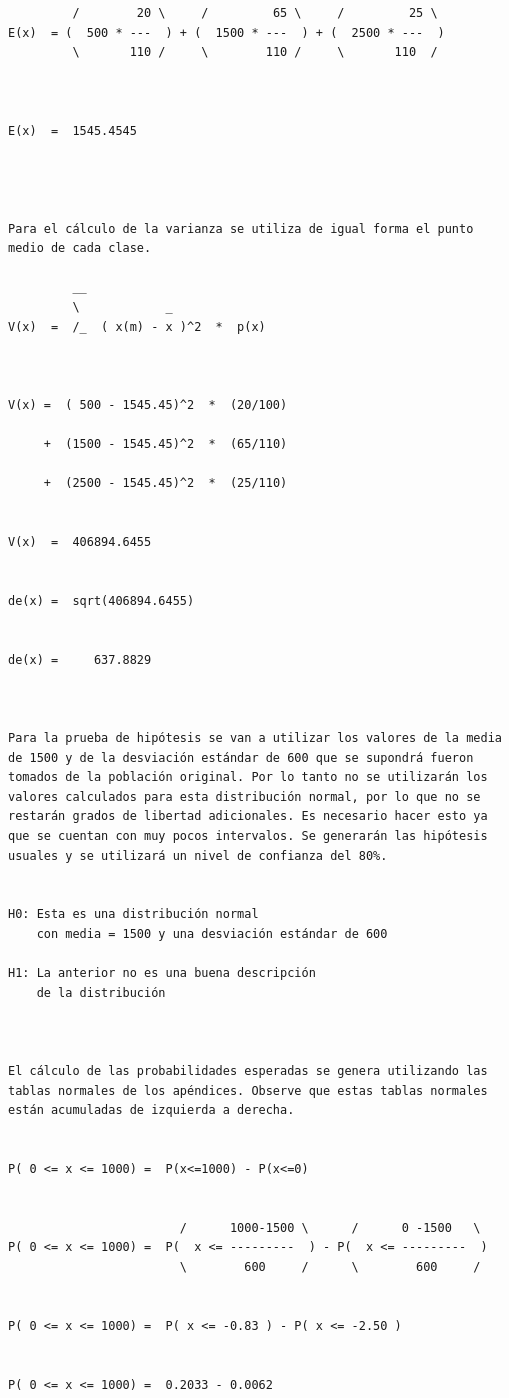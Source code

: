 \begin{verbatim}
         /        20 \     /         65 \     /         25 \
E(x)  = (  500 * ---  ) + (  1500 * ---  ) + (  2500 * ---  )
         \       110 /     \        110 /     \       110  /



E(x)  =  1545.4545




Para el cálculo de la varianza se utiliza de igual forma el punto medio de cada clase.

         __
         \            _  
V(x)  =  /_  ( x(m) - x )^2  *  p(x)



V(x) =  ( 500 - 1545.45)^2  *  (20/100)

     +  (1500 - 1545.45)^2  *  (65/110)

     +  (2500 - 1545.45)^2  *  (25/110)


V(x)  =  406894.6455


de(x) =  sqrt(406894.6455)


de(x) =     637.8829  



Para la prueba de hipótesis se van a utilizar los valores de la media de 1500 y de la desviación estándar de 600 que se supondrá fueron tomados de la población original. Por lo tanto no se utilizarán los valores calculados para esta distribución normal, por lo que no se restarán grados de libertad adicionales. Es necesario hacer esto ya que se cuentan con muy pocos intervalos. Se generarán las hipótesis usuales y se utilizará un nivel de confianza del 80%.


H0: Esta es una distribución normal
    con media = 1500 y una desviación estándar de 600

H1: La anterior no es una buena descripción
    de la distribución



El cálculo de las probabilidades esperadas se genera utilizando las tablas normales de los apéndices. Observe que estas tablas normales están acumuladas de izquierda a derecha.


P( 0 <= x <= 1000) =  P(x<=1000) - P(x<=0)


                        /      1000-1500 \      /      0 -1500   \
P( 0 <= x <= 1000) =  P(  x <= ---------  ) - P(  x <= ---------  )
                        \        600     /      \        600     /


P( 0 <= x <= 1000) =  P( x <= -0.83 ) - P( x <= -2.50 )


P( 0 <= x <= 1000) =  0.2033 - 0.0062



\end{verbatim}
